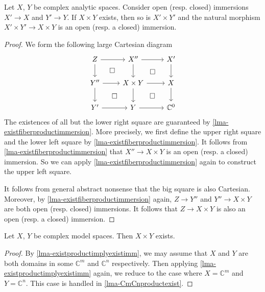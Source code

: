 \begin{lemma}\label{lma-existproductimplyexistimm}
    Let $X$, $Y$ be complex analytic spaces. Consider open (resp. closed) immersions $X'\rightarrow X$ and $Y'\rightarrow Y$. If $X\times Y$ exists, then so is $X'\times Y'$ and the natural morphism $X'\times Y'\rightarrow X\times Y$ is an open (resp. a closed) immersion.
\end{lemma}
\begin{proof}
    We form the following large Cartesian diagram
    \[
        \begin{tikzcd}
            Z \arrow[r] \arrow[d] \arrow[rd, "\square", phantom]   & X'' \arrow[r] \arrow[d] \arrow[rd, "\square", phantom]       & X' \arrow[d] \\
            Y'' \arrow[d] \arrow[r] \arrow[rd, "\square", phantom] & X\times Y \arrow[d] \arrow[r] \arrow[rd, "\square", phantom] & X \arrow[d]  \\
            Y' \arrow[r]                                           & Y \arrow[r]                                                  & \mathbb{C}^0
        \end{tikzcd}
    \]
    The existences of all but the lower right square are guaranteed by \cref{lma-existfiberproductimmersion}. More precisely, we first define the upper right square and the lower left square by \cref{lma-existfiberproductimmersion}. It follows from \cref{lma-existfiberproductimmersion} that $X''\rightarrow X\times Y$ is an open (resp. a closed) immersion. So we can apply \cref{lma-existfiberproductimmersion} again to construct the upper left square.

    It follows from general abstract nonsense that the big square is also Cartesian. Moreover, by \cref{lma-existfiberproductimmersion} again, $Z\rightarrow Y''$ and $Y''\rightarrow X\times Y$ are both open (resp. closed) immersions. It follows that $Z\rightarrow X\times Y$ is also an open (resp. a closed) immersion.
\end{proof}

\begin{corollary}\label{cor-existproductmodel}
    Let $X$, $Y$ be complex model spaces. Then $X\times Y$ exists.
\end{corollary}
\begin{proof}
    By \cref{lma-existproductimplyexistimm}, we may assume that $X$ and $Y$ are both domains in some $\mathbb{C}^m$ and $\mathbb{C}^n$ respectively. Then applying \cref{lma-existproductimplyexistimm} again, we reduce to the case where $X=\mathbb{C}^m$ and $Y=\mathbb{C}^n$. This case is handled in \cref{lma-CmCnproductexist}.
\end{proof}

